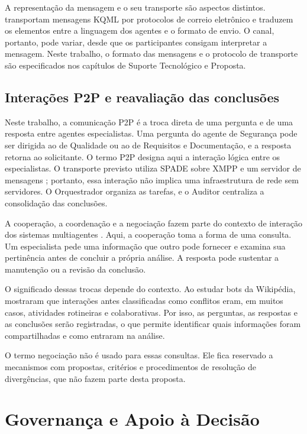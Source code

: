 A representação da mensagem e o seu transporte são aspectos distintos.  transportam mensagens KQML por protocolos de correio eletrônico e traduzem os elementos entre a linguagem dos agentes e o formato de envio. O canal, portanto, pode variar, desde que os participantes consigam interpretar a mensagem. Neste trabalho, o formato das mensagens e o protocolo de transporte são especificados nos capítulos de Suporte Tecnológico e Proposta.

\subsection{Interações P2P e reavaliação das conclusões}
\label{rt-2-4-2}

Neste trabalho, a comunicação P2P é a troca direta de uma pergunta e de uma resposta entre agentes especialistas. Uma pergunta do agente de Segurança pode ser dirigida ao de Qualidade ou ao de Requisitos e Documentação, e a resposta retorna ao solicitante. O termo P2P designa aqui a interação lógica entre os especialistas. O transporte previsto utiliza SPADE sobre XMPP e um servidor de mensagens \cite{spadeDocs,rfc6120}; portanto, essa interação não implica uma infraestrutura de rede sem servidores. O Orquestrador organiza as tarefas, e o Auditor centraliza a consolidação das conclusões.

A cooperação, a coordenação e a negociação fazem parte do contexto de interação dos sistemas multiagentes \cite{lazarin2025}. Aqui, a cooperação toma a forma de uma consulta. Um especialista pede uma informação que outro pode fornecer e examina sua pertinência antes de concluir a própria análise. A resposta pode sustentar a manutenção ou a revisão da conclusão.

O significado dessas trocas depende do contexto. Ao estudar bots da Wikipédia,  mostraram que interações antes classificadas como conflitos eram, em muitos casos, atividades rotineiras e colaborativas. Por isso, as perguntas, as respostas e as conclusões serão registradas, o que permite identificar quais informações foram compartilhadas e como entraram na análise.

O termo negociação não é usado para essas consultas. Ele fica reservado a mecanismos com propostas, critérios e procedimentos de resolução de divergências, que não fazem parte desta proposta.

\section{Governança e Apoio à Decisão}
\label{rt-2-5}

